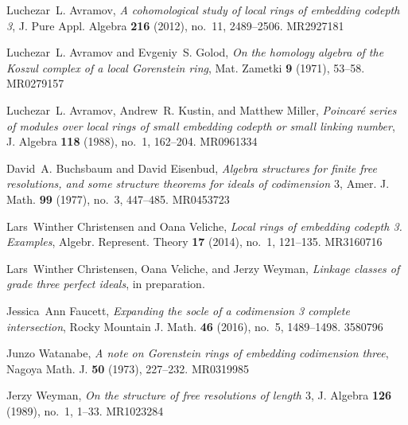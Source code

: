 \documentclass{amsart}
\theoremstyle{bfupright head,upright body}
\theoremstyle{fixed bf head,slanted body}
\theoremstyle{fixed bf head,upright body}
\theoremstyle{numbered paragraph}
\numberwithin{equation}{res}
\begin{document}
\providecommand{\MR}[1]{\mbox{\href{http://www.ams.org/mathscinet-getitem?mr=#1}{#1}}}
   \renewcommand{\MR}[1]{\mbox{\href{http://www.ams.org/mathscinet-getitem?mr=#1}{#1}}}
\providecommand{\href}[2]{#2}
\begin{thebibliography}{1}

Luchezar~L. Avramov, \emph{A cohomological study of local rings of embedding
  codepth 3}, J. Pure Appl. Algebra \textbf{216} (2012), no.~11, 2489--2506.
  \MR{MR2927181}

Luchezar~L. Avramov and Evgeniy~S. Golod, \emph{On the homology algebra of the
  {K}oszul complex of a local {G}orenstein ring}, Mat. Zametki \textbf{9}
  (1971), 53--58. \MR{MR0279157}

Luchezar~L. Avramov, Andrew~R. Kustin, and Matthew Miller, \emph{Poincar\'e
  series of modules over local rings of small embedding codepth or small
  linking number}, J. Algebra \textbf{118} (1988), no.~1, 162--204.
  \MR{MR0961334}

David~A. Buchsbaum and David Eisenbud, \emph{Algebra structures for finite free
  resolutions, and some structure theorems for ideals of codimension {$3$}},
  Amer. J. Math. \textbf{99} (1977), no.~3, 447--485. \MR{MR0453723}

Lars~Winther Christensen and Oana Veliche, \emph{Local rings of embedding
  codepth 3. {E}xamples}, Algebr. Represent. Theory \textbf{17} (2014), no.~1,
  121--135. \MR{MR3160716}

Lars~Winther Christensen, Oana Veliche, and Jerzy Weyman, \emph{Linkage classes
  of grade three perfect ideals}, in preparation.

Jessica~Ann Faucett, \emph{Expanding the socle of a codimension 3 complete
  intersection}, Rocky Mountain J. Math. \textbf{46} (2016), no.~5, 1489--1498.
  \MR{3580796}

Junzo Watanabe, \emph{A note on {G}orenstein rings of embedding codimension
  three}, Nagoya Math. J. \textbf{50} (1973), 227--232. \MR{MR0319985}

Jerzy Weyman, \emph{On the structure of free resolutions of length {$3$}}, J.
  Algebra \textbf{126} (1989), no.~1, 1--33. \MR{MR1023284}

\end{thebibliography}
\end{document}
